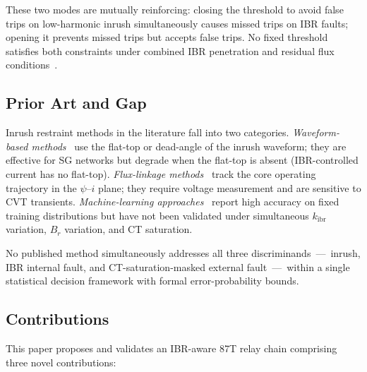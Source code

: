 \documentclass[journal,twoside,10pt]{IEEEtran}
\newcommand{\kibr}{k_{\mathrm{ibr}}}
\begin{document}
These two modes are mutually reinforcing: closing the threshold to avoid
false trips on low-harmonic inrush simultaneously causes missed trips on
IBR faults; opening it prevents missed trips but accepts false trips.
No fixed threshold satisfies both constraints under combined IBR penetration
and residual flux conditions~\cite{Winders2002,Hooshyar2019}.

\subsection{Prior Art and Gap}

Inrush restraint methods in the literature fall into two categories.
\emph{Waveform-based methods}~\cite{Kasztenny1999,Shin2003} use the
flat-top or dead-angle of the inrush waveform; they are effective for SG
networks but degrade when the flat-top is absent (IBR-controlled current
has no flat-top).
\emph{Flux-linkage methods}~\cite{Pan2004,Faramarzi2022} track the core
operating trajectory in the $\psi$--$i$ plane; they require voltage
measurement and are sensitive to CVT transients.
\emph{Machine-learning approaches}~\cite{Tripathy2010,Medeiros2018} report
high accuracy on fixed training distributions but have not been validated
under simultaneous $\kibr$ variation, $B_r$ variation, and CT saturation.

No published method simultaneously addresses all three discriminands~---~inrush,
IBR internal fault, and CT-saturation-masked external fault~---~within a
single statistical decision framework with formal error-probability bounds.

\subsection{Contributions}

This paper proposes and validates an IBR-aware 87T relay chain comprising
three novel contributions:
\end{document}
